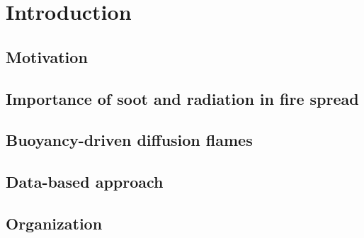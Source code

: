 \addchapheadtotoc

\chapter{Introduction}

\section{Motivation}


\section{Importance of soot and radiation in fire spread}
 

\section{Buoyancy-driven diffusion flames}
\section{Data-based approach}

\section{Organization}
